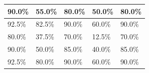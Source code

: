 \documentclass[12pt,1p]{elsarticle}
\begin{document}
\begin{table}[]
{\begin{tabular}{|l|l|l|l|l|}
90.0\%                                                                                                   & 55.0\%                                                      & 80.0\%                                                                                                    & 50.0\%                                                       & 80.0\%                                                                                                     \\ \hline
92.5\%                                                                                                   & 82.5\%                                                      & 90.0\%                                                                                                    & 60.0\%                                                       & 90.0\%                                                                                                     \\ \hline
80.0\%                                                                                                   & 37.5\%                                                      & 70.0\%                                                                                                    & 12.5\%                                                       & 70.0\%                                                                                                     \\ \hline
90.0\%                                                                                                   & 50.0\%                                                      & 85.0\%                                                                                                    & 40.0\%                                                       & 85.0\%                                                                                                     \\ \hline
92.5\%                                                                                                   & 80.0\%                                                      & 90.0\%                                                                                                    & 60.0\%                                                       & 90.0\%                                                                                                     \\ \hline
\end{tabular}%
}
\end{table}
\end{document}
